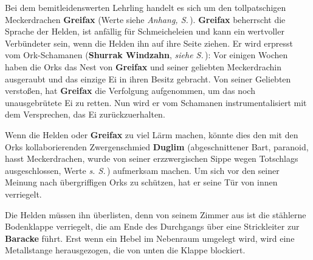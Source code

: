 

Bei dem bemitleidenswerten Lehrling handelt es sich um den tollpatschigen Meckerdrachen \textbf{Greifax} (Werte siehe \emph{Anhang, S.\,\pageref{greifax}}).
 \textbf{Greifax} beherrscht die Sprache der Helden, ist anfällig für Schmeicheleien und kann ein wertvoller Verbündeter sein, wenn die Helden ihn auf ihre Seite ziehen.
Er wird erpresst vom Ork-Schamanen (\textbf{Shurrak Windzahn}, \emph{siehe S.\,\pageref{finale}}):
Vor einigen Wochen haben die Orks das Nest von \textbf{Greifax} und seiner geliebten Meckerdrachin ausgeraubt und das einzige Ei in ihren Besitz gebracht.
Von seiner Geliebten verstoßen, hat \textbf{Greifax} die Verfolgung aufgenommen, um das noch unausgebrütete Ei zu retten.
Nun wird er vom Schamanen instrumentalisiert mit dem Versprechen, das Ei zurückzuerhalten.

Wenn die Helden oder \textbf{Greifax} zu viel Lärm machen, könnte dies den mit den Orks kollaborierenden Zwergenschmied \textbf{Duglim} (abgeschnittener Bart, paranoid, hasst Meckerdrachen, wurde von seiner erzzwergischen Sippe wegen Totschlags ausgeschlossen, Werte \emph{s. S.\,\pageref{duglim}}) aufmerksam machen.
Um sich vor den seiner Meinung nach übergriffigen Orks zu schützen, hat er seine Tür von innen verriegelt.

Die Helden müssen ihn überlisten, denn von seinem Zimmer aus ist die stählerne Bodenklappe verriegelt, die am Ende des Durchgangs über eine Strickleiter zur \textbf{Baracke} führt.
Erst wenn ein Hebel im Nebenraum umgelegt wird, wird eine Metallstange herausgezogen, die von unten die Klappe blockiert.



